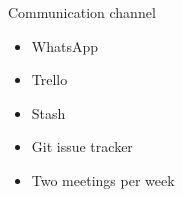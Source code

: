 \begin{frame}{Communication channel}
\begin{itemize}
		\item WhatsApp
		\item Trello
		\item Stash
		\item Git issue tracker
		\item Two meetings per week
	\end{itemize}
\end{frame}